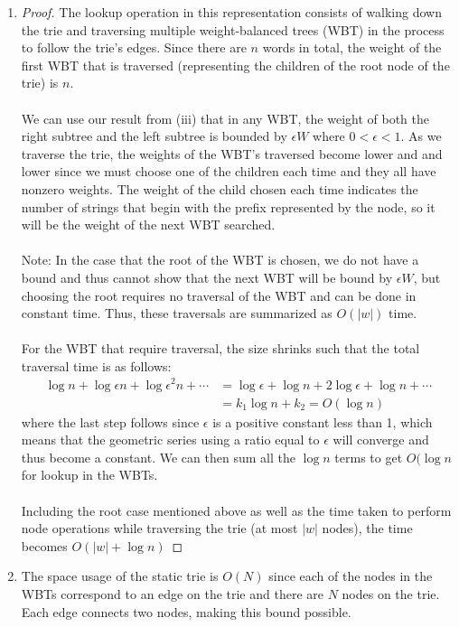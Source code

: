 \documentclass{article}
\theoremstyle{casestyle}
\begin{document}
\begin{enumerate}[i]
\item \begin{proof}{}
The lookup operation in this representation consists of walking down the trie and traversing multiple weight-balanced trees (WBT) in the process to follow the trie's edges. Since there are $n$ words in total, the weight of the first WBT that is traversed (representing the children of the root node of the trie) is $n$.\\\\
We can use our result from (iii) that in any WBT, the weight of both the right subtree and the left subtree is bounded by $\epsilon W$ where $0<\epsilon<1$. As we traverse the trie, the weights of the WBT's traversed become lower and and lower since we must choose one of the children each time and they all have nonzero weights. The weight of the child chosen each time indicates the number of strings that begin with the prefix represented by the node, so it will be the weight of the next WBT searched.\\\\ Note: In the case that the root of the WBT is chosen, we do not have a bound and thus cannot show that the next WBT will be bound by $\epsilon W$, but choosing the root requires no traversal of the WBT and can be done in constant time. Thus, these traversals are summarized as $O(\left|w\right|)$ time.\\\\ For the WBT that require traversal, the size shrinks such that the total traversal time is as follows: 
\begin{align*}
  \log{n} + \log{\epsilon n} + \log{\epsilon^2 n} + \cdots
&= \log\epsilon + \log n + 2\log\epsilon + \log n + \cdots \\
&= k_1\log n + k_2 = O(\log n)
\end{align*}
where the last step follows since $\epsilon$ is a positive constant less than 1, which means that the geometric series using a ratio equal to $\epsilon$ will converge and thus become a constant. We can then sum all the $\log n$ terms to get $O(\log n$ for lookup in the WBTs.\\\\ Including the root case mentioned above as well as the time taken to perform node operations while traversing the trie (at most $\left|w\right|$ nodes), the time becomes $O(\left|w\right| + \log n)$
\end{proof}
\item The space usage of the static trie is $O(N)$ since each of the nodes in the WBTs correspond to an edge on the trie and there are $N$ nodes on the trie. Each edge connects two nodes, making this bound possible. 
\end{enumerate}
\end{document}
